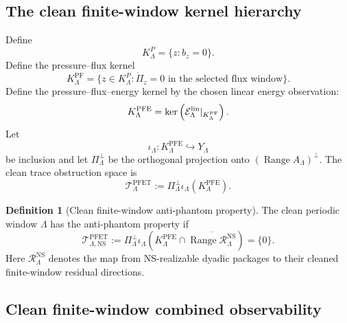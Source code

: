 \documentclass[11pt]{article}
\numberwithin{equation}{section}
\theoremstyle{plain}
\theoremstyle{definition}
\newtheorem{definition}[theorem]{Definition}
\theoremstyle{remark}
\newcommand{\NS}{\mathrm{NS}}
\newcommand{\PF}{\mathrm{PF}}
\newcommand{\PFE}{\mathrm{PFE}}
\newcommand{\PFET}{\mathrm{PFET}}
\begin{document}
\subsection{The clean finite-window kernel hierarchy}

Define
\[
        K^P_\Lambda=\{z:b_z=0\}.
\]
Define the pressure--flux kernel
\[
        K^{\PF}_\Lambda
        =
        \{z\in K^P_\Lambda:\dot\Pi_z=0\text{ in the selected flux window}\}.
\]
Define the pressure--flux--energy kernel by the chosen linear energy observation:
\[
        K^{\PFE}_\Lambda
        =
        \ker\left(\mathcal E^{\rm lin}_\Lambda|_{K^{\PF}_\Lambda}\right).
\]
Let
\[
        \iota_\Lambda:K^{\PFE}_\Lambda\hookrightarrow Y_\Lambda
\]
be inclusion and let \(\Pi_\Lambda^\perp\) be the orthogonal projection onto
\((\operatorname{Range}A_\Lambda)^\perp\).  The clean trace obstruction space is
\begin{equation}
        \mathcal T^{\PFET}_\Lambda
        :=
        \Pi_\Lambda^\perp\iota_\Lambda(K^{\PFE}_\Lambda).
        \label{eq:clean-trace-obstruction}
\end{equation}

\begin{definition}[Clean finite-window anti-phantom property]
\label{def:clean-anti-phantom-property}
The clean periodic window \(\Lambda\) has the anti-phantom property if
\begin{equation}
        \mathcal T^{\PFET}_{\Lambda,\NS}
        :=
        \Pi_\Lambda^\perp\iota_\Lambda
        \left(
          K^{\PFE}_\Lambda
          \cap
          \overline{\operatorname{Range}\mathcal R^{\NS}_\Lambda}
        \right)
        =\{0\}.
        \label{eq:clean-ns-trace-obstruction-zero}
\end{equation}
Here \(\mathcal R^{\NS}_\Lambda\) denotes the map from NS-realizable dyadic
packages to their cleaned finite-window residual directions.
\end{definition}

\subsection{Clean finite-window combined observability}
\end{document}
